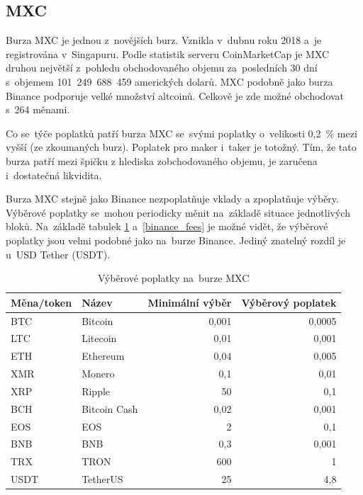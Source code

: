 \documentclass[thesis=B,czech]{FITthesis}[2019/03/21]
\begin{document}
\subsection{MXC}
Burza MXC je jednou z~novějších burz. Vznikla v~dubnu roku 2018 a~je registrována v~Singapuru. Podle statistik serveru CoinMarketCap je MXC druhou největší z~pohledu obchodovaného objemu za~posledních 30 dní s~objemem 101~249~688~459 amerických dolarů. \cite{coinmarketcap} MXC podobně jako burza Binance podporuje velké množství altcoinů. Celkově je zde možné obchodovat s~264 měnami. \cite{mxc_coins}

Co se~týče poplatků patří burza MXC se~svými poplatky o~velikosti 0,2~\% mezi vyšší (ze zkoumaných burz). Poplatek pro maker i~taker je totožný. Tím, že tato burza patří mezi špičku z hlediska zobchodovaného objemu, je zaručena i~dostatečná likvidita. \cite{cryptowisser_mxc} 

Burza MXC stejně jako Binance nezpoplatňuje vklady a zpoplatňuje výběry. Výběrové poplatky se~mohou periodicky měnit na~základě situace jednotlivých bloků. \cite{mxc_fees} Na~základě tabulek \ref{mxc_fees} a~\ref{binance_fees} je možné vidět, že výběrové poplatky jsou velmi podobné jako na~burze Binance. Jediný znatelný rozdíl je u~USD Tether (USDT). \cite{cryptowisser_mxc}

\begin{table}\centering
    \caption{Výběrové poplatky na~burze MXC \cite{mxc_fees}}
    \label{mxc_fees}
     \begin{tabular}{||l | l | r | r||} 
     \hline
     Měna/token & Název & Minimální výběr & Výběrový poplatek \\ [0.5ex] 
     \hline\hline
     BTC & Bitcoin & 0,001 & 0,0005 \\ 
     \hline
     LTC & Litecoin & 0,01 & 0,001 \\
     \hline
     ETH & Ethereum & 0,04 & 0,005 \\
     \hline
     XMR & Monero & 0,1 & 0,01 \\
     \hline
     XRP & Ripple & 50 & 0,1 \\
     \hline
     BCH & Bitcoin Cash & 0,02 & 0,001 \\
     \hline
     EOS & EOS & 2 & 0,1 \\
     \hline
     BNB & BNB & 0,3 & 0,001 \\
     \hline
     TRX & TRON & 600 & 1 \\
     \hline
     USDT & TetherUS & 25 & 4,8 \\
     \hline
    \end{tabular}
\end{table}
\end{document}
